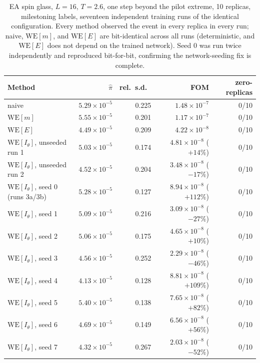 \documentclass[11pt]{article}
\begin{document}
\begin{table}[h]
	\centering\small
	\caption{EA spin glass, $L=16$, $T=2.6$, one step beyond the pilot extreme, 10 replicas,
		milestoning labels, seventeen independent training runs of the identical configuration.
		Every method observed the event in every replica in every run; naive,
		$\mathrm{WE}[m]$, and $\mathrm{WE}[E]$ are bit-identical across all runs (deterministic,
		and $\mathrm{WE}[E]$ does not depend on the trained network). Seed 0 was run twice
		independently and reproduced bit-for-bit, confirming the network-seeding fix is
		complete.}
	\label{tab:milestone}
	\begin{tabular}{lrrrr}
		\toprule
		Method & $\hat\pi$ & rel.\ s.d.\ & FOM & zero-replicas \\
		\midrule
		naive & $5.29\times10^{-5}$ & 0.225 & $1.48\times10^{-7}$ & 0/10 \\
		$\mathrm{WE}[m]$ & $5.55\times10^{-5}$ & 0.201 & $1.17\times10^{-7}$ & 0/10 \\
		$\mathrm{WE}[E]$ & $4.49\times10^{-5}$ & 0.209 & $4.22\times10^{-8}$ & 0/10 \\
		$\mathrm{WE}[I_\theta]$, unseeded run 1 & $5.03\times10^{-5}$ & 0.174 &
		$4.81\times10^{-8}$ ($+14\%$) & 0/10 \\
		$\mathrm{WE}[I_\theta]$, unseeded run 2 & $4.52\times10^{-5}$ & 0.204 &
		$3.48\times10^{-8}$ ($-17\%$) & 0/10 \\
		$\mathrm{WE}[I_\theta]$, seed 0 (runs 3a/3b) & $5.28\times10^{-5}$ & 0.127 &
		$8.94\times10^{-8}$ ($+112\%$) & 0/10 \\
		$\mathrm{WE}[I_\theta]$, seed 1 & $5.09\times10^{-5}$ & 0.216 &
		$3.09\times10^{-8}$ ($-27\%$) & 0/10 \\
		$\mathrm{WE}[I_\theta]$, seed 2 & $5.06\times10^{-5}$ & 0.175 &
		$4.65\times10^{-8}$ ($+10\%$) & 0/10 \\
		$\mathrm{WE}[I_\theta]$, seed 3 & $4.56\times10^{-5}$ & 0.252 &
		$2.29\times10^{-8}$ ($-46\%$) & 0/10 \\
		$\mathrm{WE}[I_\theta]$, seed 4 & $4.13\times10^{-5}$ & 0.128 &
		$8.81\times10^{-8}$ ($+109\%$) & 0/10 \\
		$\mathrm{WE}[I_\theta]$, seed 5 & $5.40\times10^{-5}$ & 0.138 &
		$7.65\times10^{-8}$ ($+82\%$) & 0/10 \\
		$\mathrm{WE}[I_\theta]$, seed 6 & $4.69\times10^{-5}$ & 0.149 &
		$6.56\times10^{-8}$ ($+56\%$) & 0/10 \\
		$\mathrm{WE}[I_\theta]$, seed 7 & $4.32\times10^{-5}$ & 0.267 &
		$2.03\times10^{-8}$ ($-52\%$) & 0/10 \\

\end{tabular}
\end{table}
\end{document}
